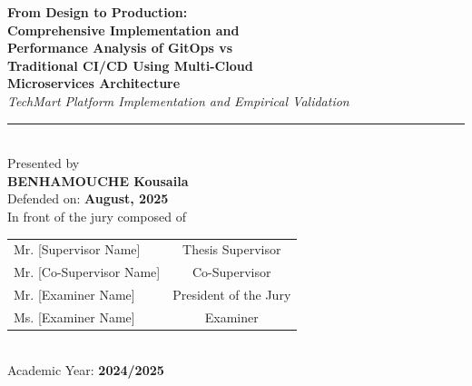 \begin{center}
{\large \textbf{From Design to Production:}} \\[0.2cm]
{\large \textbf{Comprehensive Implementation and}} \\[0.2cm]
{\large \textbf{Performance Analysis of GitOps vs}} \\[0.2cm]
{\large \textbf{Traditional CI/CD Using Multi-Cloud}} \\[0.2cm]
{\large \textbf{Microservices Architecture}} \\[0.3cm]

{\normalsize \textit{TechMart Platform Implementation and Empirical Validation}} \\[0.5cm]

\rule{10cm}{0.5pt} \\[0.8cm]

{\normalsize Presented by} \\[0.2cm]
{\large \textbf{BENHAMOUCHE Kousaila}} \\[0.5cm]

{\normalsize Defended on: \textbf{August, 2025}} \\[0.2cm]
{\normalsize In front of the jury composed of} \\[0.5cm]

\begin{tabular}{lc}
Mr. [Supervisor Name] & Thesis Supervisor \\
Mr. [Co-Supervisor Name] & Co-Supervisor \\
Mr. [Examiner Name] & President of the Jury \\
Ms. [Examiner Name] & Examiner \\
\end{tabular} \\[0.8cm]

{\normalsize Academic Year: \textbf{2024/2025}}

\end{center}

\newpage